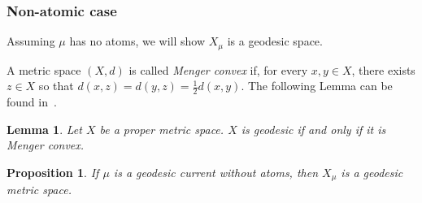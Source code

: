 \documentclass[12pt,article]{amsart}
\numberwithin{equation}{section}
\numberwithin{figure}{section}
\newtheorem{lemma}[equation]{Lemma}
\newtheorem{proposition}[equation]{Proposition}
\theoremstyle{definition}
\theoremstyle{plain}
\begin{document}
 \subsubsection{Non-atomic case}
Assuming $\mu$ has no atoms, we will show $X_{\mu}$ is a geodesic space.
 
  A metric space $(X,d)$ is called \emph{Menger convex} if, for every $x,y \in X$, there exists $z \in X$ so that $d(x,z)=d(y,z)=\frac{1}{2}d(x,y)$.
  The following Lemma can be found  in~\cite[Theorem~2.6.2]{Papadopoulos14:MetricConvexity}.
  \begin{lemma}
  Let $X$ be a proper metric space. $X$ is geodesic if and only if it is Menger convex.
  \label{lem:menger}
  \end{lemma}

 

  \begin{proposition}
  If $\mu$ is a geodesic current without atoms, then $X_{\mu}$ is a geodesic metric space.
  \label{prop:geodesic}
  \end{proposition}
\end{document}
